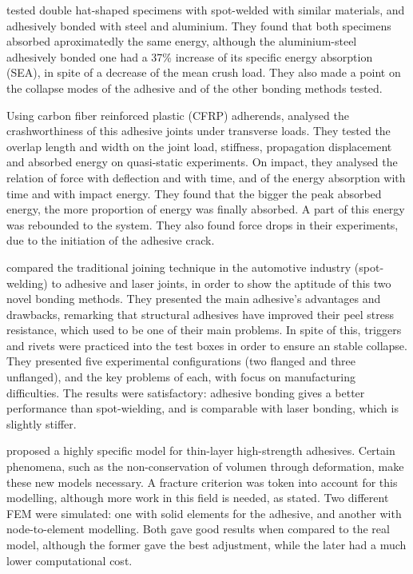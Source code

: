 \citet{Lee2006} tested double hat-shaped specimens with spot-welded with similar materials, and adhesively bonded with steel and aluminium. They found that both specimens absorbed aproximatedly the same energy, although the aluminium-steel adhesively bonded one had a 37\% increase of its specific energy absorption (SEA), in spite of a decrease of the mean crush load. They also made a point on the collapse modes of the adhesive and of the other bonding methods tested.

Using carbon fiber reinforced plastic (CFRP) adherends, \citet{Wu2013} analysed the crashworthiness of this adhesive joints under transverse loads. They tested the overlap length and width on the joint load, stiffness, propagation displacement and absorbed energy on quasi-static experiments. On impact, they analysed the relation of force with deflection and with time, and of the energy absorption with time and with impact energy. They found that the bigger the peak absorbed energy, the more proportion of energy was finally absorbed. A part of this energy was rebounded to the system. They also found force drops in their experiments, due to the initiation of the adhesive crack.

\citet{Peroni2009} compared the traditional joining technique in the automotive industry (spot-welding) to adhesive and laser joints, in order to show the aptitude of this two novel bonding methods. They presented the main adhesive's advantages and drawbacks, remarking that structural adhesives have improved their peel stress resistance, which used to be one of their main problems. In spite of this, triggers and rivets were practiced into the test boxes in order to ensure an stable collapse. They presented five experimental configurations (two flanged and three unflanged), and the key problems of each, with focus on manufacturing difficulties. The results were satisfactory: adhesive bonding gives a better performance than spot-wielding, and is comparable with laser bonding, which is slightly stiffer.

\citet{Greve2007} proposed a highly specific model for thin-layer high-strength adhesives. Certain phenomena, such as the non-conservation of volumen through deformation, make these new models necessary. A fracture criterion was token into account for this modelling, although more work in this field is needed, as stated. Two different FEM were simulated: one with solid elements for the adhesive, and another with node-to-element modelling. Both gave good results when compared to the real model, although the former gave the best adjustment, while the later had a much lower computational cost.

